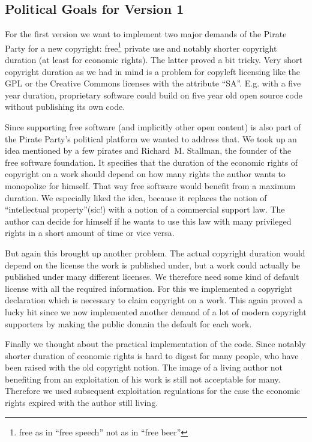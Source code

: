 \subsection{Political Goals for Version 1}

For the first version we want to implement two major demands of the Pirate Party for a new copyright: free\footnote{free as in ``free speech'' not as in ``free beer''} private use and notably shorter copyright duration (at least for economic rights). The latter proved a bit tricky. Very short copyright duration as we had in mind is a problem for copyleft licensing like the GPL or the Creative Commons licenses with the attribute ``SA''. E.g. with a five year duration, proprietary software could build on five year old open source code without publishing its own code. 

Since supporting free software (and implicitly other open content) is also part of the Pirate Party's political platform we wanted to address that. We took up an idea mentioned by a few pirates and Richard~M. Stallman, the founder of the free software foundation. It specifies that the duration of the economic rights of copyright on a work should depend on how many rights the author wants to monopolize for himself. That way free software would benefit from a maximum duration. We especially liked the idea, because it replaces the notion of ``intellectual property''(sic!) with a notion of a commercial support law. The author can decide for himself if he wants to use this law with many privileged rights in a short amount of time or vice versa. 

But again this brought up another problem. The actual copyright duration would depend on the license the work is published under, but a work could actually be published under many different licenses. We therefore need some kind of default license with all the required information. For this we implemented a copyright declaration which is necessary to claim copyright on a work. This again proved a lucky hit since we now implemented another demand of a lot of modern copyright supporters by making the public domain the default for each work.

Finally we thought about the practical implementation of the code. Since notably shorter duration of economic rights is hard to digest for many people, who have been raised with the old copyright notion. The image of a living author not benefiting from an exploitation of his work is still not acceptable for many. Therefore we used subsequent exploitation regulations for the case the economic rights expired with the author still living.

